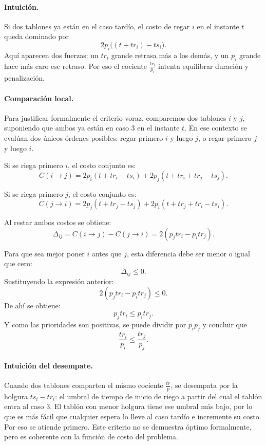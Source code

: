\documentclass[12pt,a4paper]{article}
\begin{document}
\paragraph{Intuici\'on.}
Si dos tablones ya est\'an en el caso tard\'io, el costo de regar \(i\) en el instante \(t\) queda dominado por
\[
2p_i\bigl((t+tr_i)-ts_i\bigr).
\]
Aqu\'i aparecen dos fuerzas: un \(tr_i\) grande retrasa m\'as a los dem\'as, y un \(p_i\) grande hace m\'as caro ese retraso. Por eso el cociente \(\frac{tr_i}{p_i}\) intenta equilibrar duraci\'on y penalizaci\'on.

\paragraph{Comparaci\'on local.}
Para justificar formalmente el criterio voraz, comparemos dos tablones \(i\) y \(j\), suponiendo que ambos ya est\'an en caso 3 en el instante \(t\). En ese contexto se eval\'uan dos \'unicos \'ordenes posibles: regar primero \(i\) y luego \(j\), o regar primero \(j\) y luego \(i\).

Si se riega primero \(i\), el costo conjunto es:
\[
C(i\rightarrow j)=2p_i(t+tr_i-ts_i)+2p_j(t+tr_i+tr_j-ts_j).
\]

Si se riega primero \(j\), el costo conjunto es:
\[
C(j\rightarrow i)=2p_j(t+tr_j-ts_j)+2p_i(t+tr_j+tr_i-ts_i).
\]

Al restar ambos costos se obtiene:
\[
\Delta_{ij}=C(i\rightarrow j)-C(j\rightarrow i)=2(p_jtr_i-p_itr_j).
\]

Para que sea mejor poner \(i\) antes que \(j\), esta diferencia debe ser menor o igual que cero:
\[
\Delta_{ij}\le 0.
\]
Sustituyendo la expresi\'on anterior:
\[
2(p_jtr_i-p_itr_j)\le 0.
\]
De ah\'i se obtiene:
\[
p_jtr_i\le p_itr_j.
\]
Y como las prioridades son positivas, se puede dividir por \(p_ip_j\) y concluir que
\[
\frac{tr_i}{p_i}\leq \frac{tr_j}{p_j}.
\]

\paragraph{Intuici\'on del desempate.}
Cuando dos tablones comparten el mismo cociente $\frac{tr}{p}$, se desempata por la 
holgura $ts_i - tr_i$: el umbral de tiempo de inicio de riego a partir del cual 
el tabl\'on entra al caso 3. El tabl\'on con menor holgura tiene ese umbral m\'as 
bajo, por lo que es m\'as f\'acil que cualquier espera lo lleve al caso tard\'io 
e incremente su costo. Por eso se atiende primero. Este criterio no se demuestra 
\'optimo formalmente, pero es coherente con la funci\'on de costo del problema.
\end{document}
